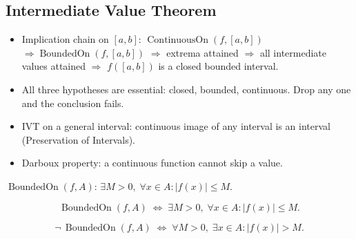 
\subsection{Intermediate Value Theorem}
\label{sec:ivt}

\begin{tcolorbox}[title={Toolkit --- Boundedness, Extrema, and Intermediate Values}]
\begin{itemize}
  \item Implication chain on $[a,b]$:
    $\operatorname{ContinuousOn}(f,[a,b])$
    $\Rightarrow\operatorname{BoundedOn}(f,[a,b])$
    $\Rightarrow$ extrema attained
    $\Rightarrow$ all intermediate values attained
    $\Rightarrow$ $f([a,b])$ is a closed bounded interval.
  \item All three hypotheses are essential: closed, bounded, continuous.
    Drop any one and the conclusion fails.
  \item IVT on a general interval: continuous image of any interval
    is an interval (Preservation of Intervals).
  \item Darboux property: a continuous function cannot skip a value.
\end{itemize}
\end{tcolorbox}


\begin{definition}
\label{def:bounded-on-a-set}
$\operatorname{BoundedOn}(f,A)$: $\exists M>0,\;\forall x\in A:
|f(x)|\leq M$.
\end{definition}

\begin{remark*}
\[
  \operatorname{BoundedOn}(f,A)
  \;\iff\;
  \exists M>0,\;\forall x\in A:|f(x)|\leq M.
\]
\end{remark*}

\begin{remark*}
\[
  \neg\,\operatorname{BoundedOn}(f,A)
  \;\iff\;
  \forall M>0,\;\exists x\in A:|f(x)|>M.
\]
\end{remark*}

